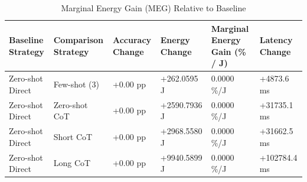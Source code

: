 \begin{table}
\caption{Marginal Energy Gain (MEG) Relative to Baseline}
\label{tab:marginal_energy_gain}
\begin{tabular}{llllll}
\toprule
Baseline Strategy & Comparison Strategy & Accuracy Change & Energy Change & Marginal Energy Gain (\% / J) & Latency Change \\
\midrule
Zero-shot Direct & Few-shot (3) & +0.00 pp & +262.0595 J & 0.0000 \%/J & +4873.6 ms \\
Zero-shot Direct & Zero-shot CoT & +0.00 pp & +2590.7936 J & 0.0000 \%/J & +31735.1 ms \\
Zero-shot Direct & Short CoT & +0.00 pp & +2968.5580 J & 0.0000 \%/J & +31662.5 ms \\
Zero-shot Direct & Long CoT & +0.00 pp & +9940.5899 J & 0.0000 \%/J & +102784.4 ms \\
\bottomrule
\end{tabular}
\end{table}
